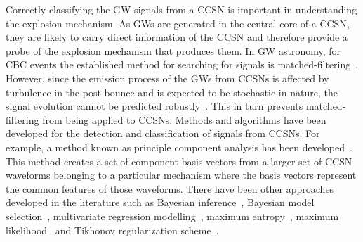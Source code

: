 \documentclass[aps,twocolumn,showpacs,groupedaddress, nofootinbib]{revtex4}  %
\begin{document}
%
%
Correctly classifying the \ac{GW} signals from a \ac{CCSN} is important in
understanding the explosion mechanism.
As \acp{GW} are generated in the central core of a \ac{CCSN}, they
are likely to carry direct information of the \ac{CCSN} and therefore provide a
probe of the explosion mechanism that produces them. In \ac{GW} astronomy, for
\ac{CBC} events the established method for searching for signals is
matched-filtering~\cite{usman2016pycbc, cannon2012toward}. However, since the
emission process of the \acp{GW} from \acp{CCSN} is affected by turbulence in
the post-bounce and is expected to be stochastic in nature,  the signal
evolution cannot be predicted robustly~\cite{ott2009gravitational,
kotake2013multiple, kotake2009stochastic, aloy2019neutron}.  This in turn prevents
matched-filtering from being applied to \acp{CCSN}.
Methods and algorithms have been developed for the detection and classification
of signals from \acp{CCSN}.  For example, a method known as principle component
analysis has been developed~\cite{heng2009rotating, rover2009bayesian,
powell2015classification, powell2017classification,
suvorova2019reconstructing}. This method creates a set of component basis
vectors from a larger set of \ac{CCSN} waveforms belonging to a
particular mechanism where the basis vectors represent the common features of
those waveforms.  There have been other approaches developed in the literature
such as Bayesian inference~\cite{rover2009bayesian, cannon2012toward}, Bayesian model
selection~\cite{logue2012inferring}, multivariate regression
modelling~\cite{engels2014multivariate}, maximum
entropy~\cite{summerscales2008maximum}, maximum
likelihood~\cite{klimenko2016method} and Tikhonov regularization
scheme~\cite{rakhmanov2006rank, hayama2007coherent}.  
\end{document}
